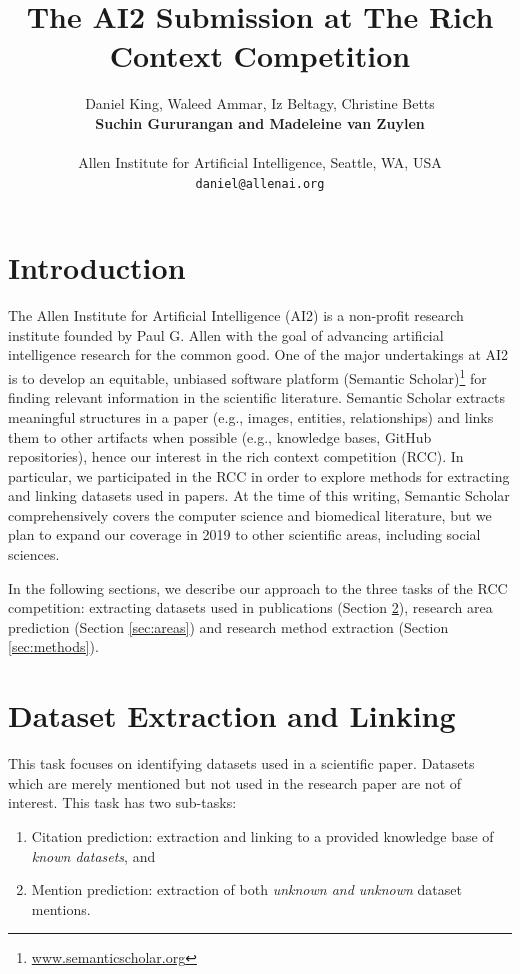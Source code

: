 \documentclass[11pt]{article}
\title{The AI2 Submission at The Rich Context Competition}
\author{Daniel King, Waleed Ammar, Iz Beltagy, Christine Betts \\ \textbf{Suchin Gururangan and Madeleine van Zuylen} \\
\\
Allen Institute for Artificial Intelligence, Seattle, WA, USA\\
{\tt daniel@allenai.org}\\}
\date{}
\begin{document}
\maketitle

\section{Introduction}
The Allen Institute for Artificial Intelligence (AI2) is a non-profit research institute founded by Paul G. Allen with the goal of advancing artificial intelligence research for the common good.
One of the major undertakings at AI2 is to develop an equitable, unbiased software platform (Semantic Scholar)\footnote{\url{www.semanticscholar.org}} for finding relevant information in the scientific literature.
Semantic Scholar extracts meaningful structures in a paper (e.g., images, entities, relationships) and links them to other artifacts when possible (e.g., knowledge bases, GitHub repositories), hence our interest in the rich context competition (RCC).
In particular, we participated in the RCC in order to explore methods for extracting and linking datasets used in papers.
At the time of this writing, Semantic Scholar comprehensively covers the computer science and biomedical literature, but we plan to expand our coverage in 2019 to other scientific areas, including social sciences.

In the following sections, we describe our approach to the three tasks of the RCC competition: extracting datasets used in publications (Section \ref{sec:datasets}), research area prediction (Section \ref{sec:areas}) and research method extraction (Section \ref{sec:methods}).

\section{Dataset Extraction and Linking}\label{sec:datasets}
This task focuses on identifying datasets used in a scientific paper. 
Datasets which are merely mentioned but not used in the research paper are not of interest.
This task has two sub-tasks:
\begin{enumerate}
    \item Citation prediction: extraction and linking to a provided knowledge base of \emph{known datasets}, and 
    \item Mention prediction: extraction of both \emph{unknown and unknown} dataset mentions.
\end{enumerate}
\end{document}
